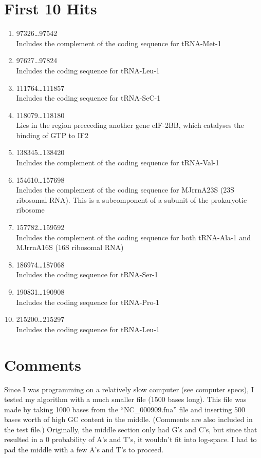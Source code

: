 \documentclass[a4paper, 12pt]{report}
\begin{document}
\section{First 10 Hits}
    \begin{enumerate}
        \item  97326\ldots{}97542  \\
            Includes the complement of the coding sequence for tRNA-Met-1
        \item  97627\ldots{}97824  \\
            Includes the coding sequence for tRNA-Leu-1
        \item 111764\ldots{}111857 \\
            Includes the coding sequence for tRNA-SeC-1
        \item 118079\ldots{}118180 \\
            Lies in the region preceeding another gene eIF-2BB, 
            which catalyses the binding of GTP to IF2
        \item 138345\ldots{}138420 \\
            Includes the complement of the coding sequence for tRNA-Val-1
        \item 154610\ldots{}157698 \\
            Includes the complement of the coding sequence for MJrrnA23S (23S ribosomal RNA).  
            This is a subcomponent of a subunit of the prokaryotic ribosome
        \item 157782\ldots{}159592 \\
            Includes the complement of the coding sequence for both tRNA-Ala-1 and MJrrnA16S (16S ribosomal RNA)
        \item 186974\ldots{}187068 \\
            Includes the coding sequence for tRNA-Ser-1
        \item 190831\ldots{}190908 \\
            Includes the coding sequence for tRNA-Pro-1
        \item 215200\ldots{}215297 \\
            Includes the coding sequence for tRNA-Leu-1
    \end{enumerate}

\section{Comments}
    Since I was programming on a relatively slow computer (see computer specs),
        I tested my algorithm with a much smaller file (1500 bases long).
    This file was made by taking 1000 bases from the ``NC\_000909.fna'' file
        and inserting 500 bases worth of high GC content in the middle.
    (Comments are also included in the test file.)
    Originally, the middle section only had G's and C's,
        but since that resulted in a 0 probability of A's and T's,
        it wouldn't fit into log-space.
    I had to pad the middle with a few A's and T's to proceed.
\end{document}
